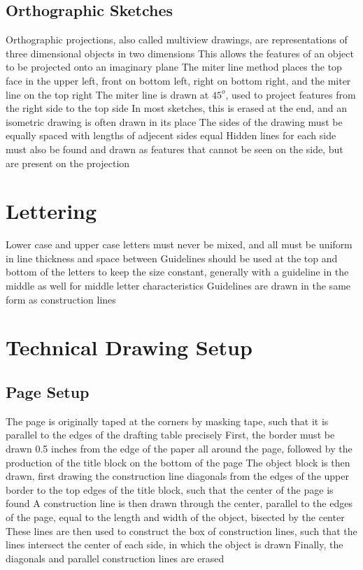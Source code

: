 \documentclass[11 pt, twoside]{article}
\newenvironment{outline*}
{
	\begin{outline}[enumerate]
	}
	{\end{outline}
}
\begin{document}
\subsection{Orthographic Sketches}
\begin{outline*}
\1 Orthographic projections, also called multiview drawings, are representations of three dimensional objects in two dimensions
\2 This allows the features of an object to be projected onto an imaginary plane
\1 The miter line method places the top face in the upper left, front on bottom left, right on bottom right, and the miter line on the top right
\2 The miter line is drawn at $45^o$, used to project features from the right side to the top side
\3 In most sketches, this is erased at the end, and an isometric drawing is often drawn in its place
\2 The sides of the drawing must be equally spaced with lengths of adjecent sides equal
\2 Hidden lines for each side must also be found and drawn as features that cannot be seen on the side, but are present on the projection
\end{outline*}
\section{Lettering}
\begin{outline*}
\1 Lower case and upper case letters must never be mixed, and all must be uniform in line thickness and space between
\1 Guidelines should be used at the top and bottom of the letters to keep the size constant, generally with a guideline in the middle as well for middle letter characteristics
\2 Guidelines are drawn in the same form as construction lines
\end{outline*}

\section{Technical Drawing Setup}
\subsection{Page Setup}
\begin{outline*}
\1 The page is originally taped at the corners by masking tape, such that it is parallel to the edges of the drafting table precisely 
\1 First, the border must be drawn 0.5 inches from the edge of the paper all around the page, followed by the production of the title block on the bottom of the page
\1 The object block is then drawn, first drawing the construction line diagonals from the edges of the upper border to the top edges of the title block, such that the center of the page is found
\2 A construction line is then drawn through the center, parallel to the edges of the page, equal to the length and width of the object, bisected by the center
\2 These lines are then used to construct the box of construction lines, such that the lines intersect the center of each side, in which the object is drawn
\2 Finally, the diagonals and parallel construction lines are erased
\end{outline*}
\end{document}
